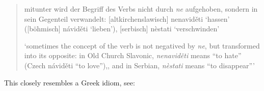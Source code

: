 \begin{quote}
mitunter wird der Begriff des Verbs nicht durch \textit{ne} aufgehoben, sondern in sein Gegenteil verwandelt: [altkirchenslawisch] nenaviděti ‘hassen’ ([böhmisch] náviděti ‘lieben’), [serbisch] nèstati ‘verschwinden’

`sometimes the concept of the verb is not negatived by \textit{ne}, but transformed into its opposite: in Old Church Slavonic, \textit{nenaviděti} means ``to hate'' (Czech náviděti ``to love''),, and in Serbian, \textit{nèstati} means ``to disappear''' %
\end{quote}

This closely resembles a Greek idiom, see:

